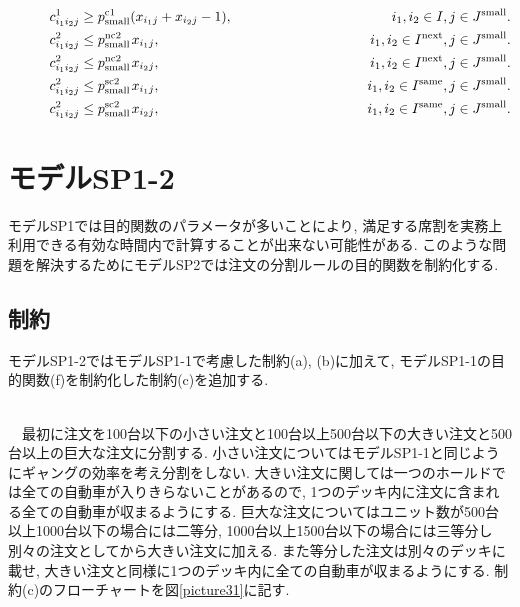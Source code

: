\begin{center}
\begin{align}
&\hspace{3.0em} {c^1_{i_1i_2j}} \geq p_{\rm{small}}^{\rm{c1}} ({x_{i_1j}} + {x_{i_2j}} - 1), \hspace{11.64em} {i_1},{i_2} \in I, j \in J^{\rm{small}}. \\
&\hspace{3.0em} {c^2_{i_1i_2j}} \leq p_{\rm{small}}^{\rm{nc2}} \hspace{0.10em}{x_{i_1j}}, \hspace{15.35em} {i_1},{i_2} \in I^{\rm{next}}, j \in J^{\rm{small}}. \\
&\hspace{3.0em} {c^2_{i_1i_2j}} \leq p_{\rm{small}}^{\rm{nc2}} \hspace{0.10em}{x_{i_2j}}, \hspace{15.35em} {i_1},{i_2} \in I^{\rm{next}}, j \in J^{\rm{small}}. \\
&\hspace{3.0em} {c^2_{i_1i_2j}} \leq p_{\rm{small}}^{\rm{sc2}} \hspace{0.10em}{x_{i_1j}}, \hspace{15.15em} {i_1},{i_2} \in I^{\rm{same}}, j \in J^{\rm{small}}. \\
&\hspace{3.0em} {c^2_{i_1i_2j}} \leq p_{\rm{small}}^{\rm{sc2}} \hspace{0.10em}{x_{i_2j}}, \hspace{15.15em} {i_1},{i_2} \in I^{\rm{same}}, j \in J^{\rm{small}}.
\end{align}
\end{center}

\section{モデルSP1-2}
モデルSP1では目的関数のパラメータが多いことにより, 満足する席割を実務上利用できる有効な時間内で計算することが出来ない可能性がある.  このような問題を解決するためにモデルSP2では注文の分割ルールの目的関数を制約化する.

\subsection{制約}
モデルSP1-2ではモデルSP1-1で考慮した制約(a), (b)に加えて, モデルSP1-1の目的関数(f)を制約化した制約(c)を追加する. \\

\clearpage


 \\
　最初に注文を100台以下の小さい注文と100台以上500台以下の大きい注文と500台以上の巨大な注文に分割する. 小さい注文についてはモデルSP1-1と同じようにギャングの効率を考え分割をしない. 大きい注文に関しては一つのホールドでは全ての自動車が入りきらないことがあるので, 1つのデッキ内に注文に含まれる全ての自動車が収まるようにする. 巨大な注文についてはユニット数が500台以上1000台以下の場合には二等分, 1000台以上1500台以下の場合には三等分し別々の注文としてから大きい注文に加える. また等分した注文は別々のデッキに載せ, 大きい注文と同様に1つのデッキ内に全ての自動車が収まるようにする. 制約(c)のフローチャートを図\ref{picture31}に記す. \\

